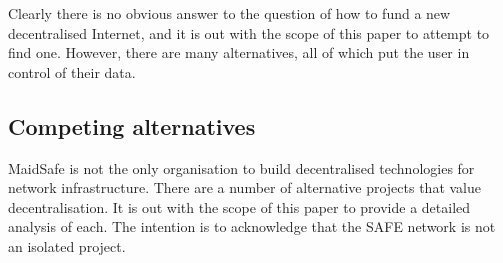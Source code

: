 \documentclass[twocolumn,english]{article}
\begin{document}
Clearly there is no obvious answer to the question of how to fund a new decentralised Internet, and it is out with the scope of this paper to attempt to find one. However, there are many alternatives, all of which put the user in control of their data.

%
%

\subsection{Competing alternatives}


MaidSafe is not the only organisation to build decentralised technologies for network infrastructure.  There are a number of alternative projects that value decentralisation. It is out with the scope of this paper to provide a detailed analysis of each.  The intention is to acknowledge that 
the SAFE network is not an isolated project. %
\end{document}
